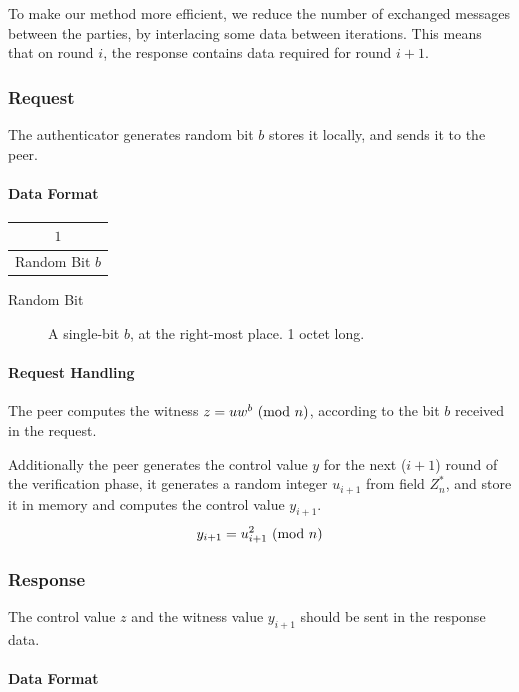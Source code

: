 To make our method more efficient, we reduce the number of exchanged messages between the parties,
by interlacing some data between iterations.
This means that on round $i$, the response contains data required for round $i+1$.

\subsubsection{Request}
The authenticator generates random bit $b$ stores it locally, and sends it to the peer.
\paragraph{Data Format}

\begin{center}
\begin{tabular}{|c|}
	\hline
	$1$ \\
	\hline
	Random Bit $b$\\
	\hline
\end{tabular}
\end{center}

\begin{description}
	\item[Random Bit] A single-bit $b$, at the right-most place. 1 octet long.
\end{description}

\paragraph{Request Handling}
The peer computes the witness $z = uw^b \ (\mathrm{mod}\ n)$, according to the bit $b$ received in the request.

Additionally the peer generates the control value $y$ for the next ($i+1$) round of the verification phase, it generates a random integer $u_{i+1}$ from field $Z^*_n$, and store it in memory and computes the control value $y_{i+1}$.
$$y_{i+1} = u_{i+1}^2 \ (\mathrm{mod}\ n)$$

\subsubsection{Response}

The control value $z$ and the witness value $y_{i+1}$ should be sent in the response data.
\paragraph{Data Format}

